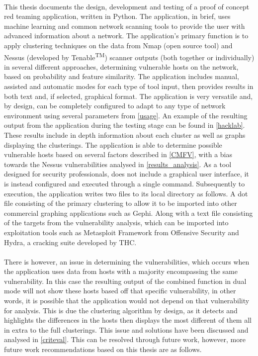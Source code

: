 \paragraph{}This thesis documents the design, development and testing of a proof of concept red teaming application, written in Python. The application, in brief, uses machine learning and common network scanning tools to provide the user with advanced information about a network. The application's primary function is to apply clustering techniques on the data from Nmap (open source tool) and Nessus (developed by Tenable\textsuperscript{TM}) scanner outputs (both together or individually) in several different approaches, determining vulnerable hosts on the network, based on probability and feature similarity. The application includes manual, assisted and automatic modes for each type of tool input, then provides results in both text and, if selected, graphical format. The application is very versatile and, by design, can be completely configured to adapt to any type of network environment using several parameters from \ref{usage}.  An example of the resulting output from the application during the testing stage can be found in \ref{hacklab}. These results include in depth information about each cluster as well as graphs displaying the clusterings. The application is able to determine possible vulnerable hosts based on several factors described in \ref{CMFV}, with a bias towards the Nessus vulnerabilities analysed in \ref{results_analysis}. As a tool designed for security professionals, does not include a graphical user interface, it is instead configured and executed through a single command. Subsequently to execution, the application writes two files to its local directory as follows. A dot file consisting of the primary clustering to allow it to be imported into other commercial graphing applications such as Gephi. Along with a text file consisting of the targets from the vulnerability analysis, which can be imported into exploitation tools such as Metasploit Framework from Offensive Security\textsuperscript{\textregistered} and Hydra, a cracking suite developed by THC.

\paragraph{}There is however, an issue in determining the vulnerabilities, which occurs when the application uses data from hosts with a majority encompassing the same vulnerability. In this case the resulting output of the combined function in dual mode will not show these hosts based off that specific vulnerability, in other words, it is possible that the application would not depend on that vulnerability for analysis. This is due the clustering algorithm by design, as it detects and highlights the differences in the hosts then displays the most different of them all in extra to the full clusterings. This issue and solutions have been discussed and analysed in \ref{criteval}. This can be resolved through future work, however, more future work recommendations based on this thesis are as follows.

